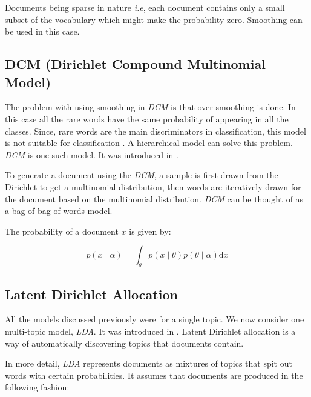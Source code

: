 Documents being sparse in nature \textit{i.e}, each document contains only a small subset of the vocabulary which might make the probability
zero. Smoothing can be used in this case. 

\subsection{DCM (Dirichlet Compound Multinomial Model)}

The problem with using smoothing in \textit{DCM} is that over-smoothing is done. In this case all the rare words have the same probability
of appearing in all the classes. Since, rare words are the main discriminators in classification, this model is not suitable for
classification \citep*{madsen2005modeling}. A hierarchical model can solve this problem. \textit{DCM} is one such model. It was introduced in \citep*{madsen2005modeling}.

To generate a document using the \textit{DCM}, a sample is first drawn from the Dirichlet to get a multinomial distribution, then words are
iteratively drawn for the document based on the multinomial distribution. \textit{DCM} can be thought of as a bag-of-bag-of-words-model.
\citep*{madsen2005modeling}


The probability of a document \(x\) is given by:

\begin{equation}
 p(x \mid \alpha) = \int_\theta p(x \mid \theta ) p(\theta \mid \alpha) \mathrm{d}x 
\end{equation}

\subsection{Latent Dirichlet Allocation}

All the models discussed previously were for a single topic. We now consider one multi-topic model, \textit{LDA}. It was introduced in 
\citep*{blei2003latent}. Latent Dirichlet allocation is a way of automatically discovering topics that documents contain. 

In more detail, \textit{LDA} represents documents as mixtures of topics that spit out words with certain probabilities. It assumes that 
documents are produced in the following fashion: 

